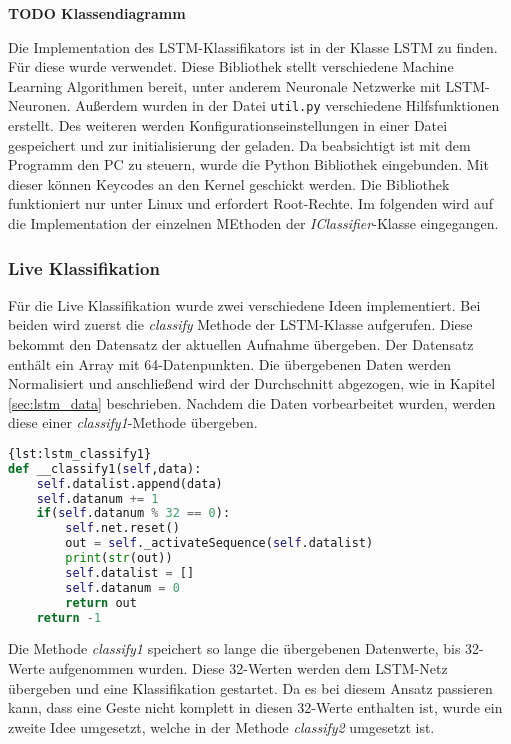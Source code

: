 \textbf{TODO Klassendiagramm}

Die Implementation des \ac{LSTM}-Klassifikators ist in der Klasse LSTM zu finden.
Für diese wurde \cite{PyBrain} verwendet. Diese Bibliothek stellt verschiedene
Machine Learning Algorithmen bereit, unter anderem Neuronale Netzwerke mit 
\ac{LSTM}-Neuronen.
Außerdem wurden in der Datei \texttt{util.py} verschiedene Hilfsfunktionen
erstellt.
Des weiteren werden Konfigurationseinstellungen in einer Datei gespeichert und zur 
initialisierung der geladen. 
Da beabsichtigt ist mit dem Programm den PC zu steuern, wurde die Python Bibliothek 
\cite{Python-uinput} eingebunden. Mit dieser können Keycodes an den Kernel geschickt werden.
Die Bibliothek funktioniert nur unter Linux und erfordert Root-Rechte.
Im folgenden wird auf die Implementation der einzelnen MEthoden der 
\textit{IClassifier}-Klasse eingegangen.

\subsubsection*{Live Klassifikation}
Für die Live Klassifikation wurde zwei verschiedene Ideen implementiert. 
Bei beiden wird zuerst die \textit{classify} Methode der LSTM-Klasse 
aufgerufen. Diese bekommt den Datensatz der aktuellen Aufnahme übergeben. 
Der Datensatz enthält ein Array mit 64-Datenpunkten. Die übergebenen Daten werden 
Normalisiert und anschließend wird der Durchschnitt abgezogen, wie in Kapitel 
\autoref{sec:lstm_data} beschrieben. Nachdem die Daten vorbearbeitet wurden, 
werden diese einer \textit{classify1}-Methode übergeben. 
\begin{lstlisting}[language=Python,caption={Classify
Variante 1},label={lst:lstm_classify1}]{lst:lstm_classify1}
def __classify1(self,data):
	self.datalist.append(data)
	self.datanum += 1
	if(self.datanum % 32 == 0):
		self.net.reset()
		out = self._activateSequence(self.datalist)
		print(str(out))
		self.datalist = []
		self.datanum = 0
		return out
	return -1
\end{lstlisting}

Die Methode \textit{classify1} speichert so lange die übergebenen Datenwerte, 
bis 32-Werte aufgenommen wurden. Diese 32-Werten werden dem \ac{LSTM}-Netz 
übergeben und eine Klassifikation gestartet. Da es bei diesem Ansatz passieren kann, 
dass eine Geste nicht komplett in diesen 32-Werte enthalten ist, wurde ein zweite 
Idee umgesetzt, welche in der Methode \textit{classify2} umgesetzt ist.

